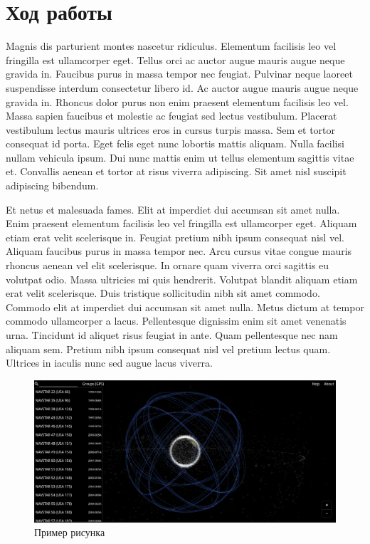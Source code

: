 \documentclass[a4paper, 14pt]{extarticle}
\begin{document}
\section*{Ход работы}
Magnis dis parturient montes nascetur ridiculus. Elementum facilisis leo vel fringilla est ullamcorper eget. Tellus orci ac auctor augue mauris augue neque gravida in. Faucibus purus in massa tempor nec feugiat. Pulvinar neque laoreet suspendisse interdum consectetur libero id. Ac auctor augue mauris augue neque gravida in. Rhoncus dolor purus non enim praesent elementum facilisis leo vel. Massa sapien faucibus et molestie ac feugiat sed lectus vestibulum. Placerat vestibulum lectus mauris ultrices eros in cursus turpis massa. Sem et tortor consequat id porta. Eget felis eget nunc lobortis mattis aliquam. Nulla facilisi nullam vehicula ipsum. Dui nunc mattis enim ut tellus elementum sagittis vitae et. Convallis aenean et tortor at risus viverra adipiscing. Sit amet nisl suscipit adipiscing bibendum.

Et netus et malesuada fames. Elit at imperdiet dui accumsan sit amet nulla. Enim praesent elementum facilisis leo vel fringilla est ullamcorper eget. Aliquam etiam erat velit scelerisque in. Feugiat pretium nibh ipsum consequat nisl vel. Aliquam faucibus purus in massa tempor nec. Arcu cursus vitae congue mauris rhoncus aenean vel elit scelerisque. In ornare quam viverra orci sagittis eu volutpat odio. Massa ultricies mi quis hendrerit. Volutpat blandit aliquam etiam erat velit scelerisque. Duis tristique sollicitudin nibh sit amet commodo. Commodo elit at imperdiet dui accumsan sit amet nulla. Metus dictum at tempor commodo ullamcorper a lacus. Pellentesque dignissim enim sit amet venenatis urna. Tincidunt id aliquet risus feugiat in ante. Quam pellentesque nec nam aliquam sem. Pretium nibh ipsum consequat nisl vel pretium lectus quam. Ultrices in iaculis nunc sed augue lacus viverra.

\begin{figure}[h]
    \centering
    \includegraphics[width=\textwidth]{../res/example.png}
    \caption{Пример рисунка}
\end{figure}
\end{document}
